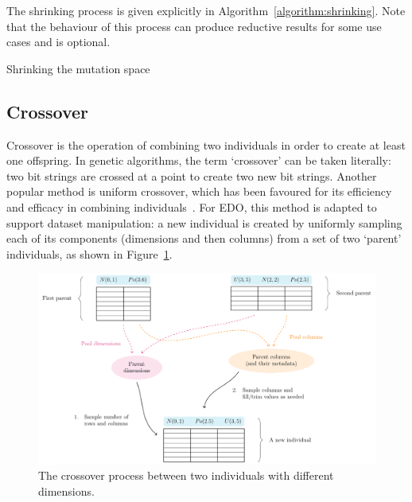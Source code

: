 \documentclass[smallextended]{svjour3}
\newcommand{\balg}[1][htbp]{%
    \begin{algorithm}[#1]\DontPrintSemicolon
}
\newcommand{\ealg}{%
    \end{algorithm}
}
\begin{document}
The shrinking process is given explicitly in
Algorithm~\ref{algorithm:shrinking}. Note that the behaviour of this process can 
produce reductive results for some use cases and is optional.

\balg%

\caption{Shrinking the mutation space}\label{algorithm:shrinking}
\ealg%

\subsection{Crossover}

Crossover is the operation of combining two individuals in order to create at
least one offspring. In genetic algorithms, the term `crossover' can be taken
literally: two bit strings are crossed at a point to create two new bit strings.
Another popular method is uniform crossover, which has been favoured for its
efficiency and efficacy in combining individuals~\cite{Semenkin2012}. For EDO,
this method is adapted to support dataset manipulation: a new individual is
created by uniformly sampling each of its components (dimensions and then
columns) from a set of two `parent' individuals, as shown in
Figure~\ref{fig:crossover}.

\begin{figure}[htbp]
    \centering
    \includegraphics[width=\linewidth]{Fig5.pdf}
    \caption{%
        The crossover process between two individuals with different dimensions.
    }\label{fig:crossover}
\end{figure}
\end{document}
